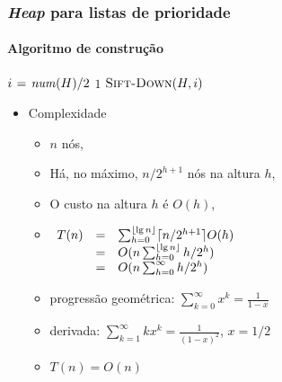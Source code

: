 \documentclass{beamer}
\begin{document}
\begin{frame}










\end{frame}

\begin{frame}
  \frametitle{\textit{Heap} para listas de prioridade}
  \framesubtitle{Algoritmo de construção}

\begin{codebox}
\li \For $i \gets \id{num}(H)/2$ \Downto $1$
\li   \Do 
        $\textnormal{\scshape Sift-Down}(H, i)$
      \End
\end{codebox}

\begin{itemize}
\item Complexidade
\begin{itemize}
\item $n$ nós,
\item Há, no máximo, $n/2^{h+1}$ nós na altura $h$,
\item O custo na altura $h$ é $O(h)$,
\item $\begin{array}[t]{rcl}
    T(n) & = & \sum_{h=0}^{\lfloor \lg n \rfloor} \lceil n / 2^{h+1} \rceil O(h) \\
    & = & O(n \sum_{h=0}^{\lfloor \lg n \rfloor} h/2^h) \\
    & = & O(n \sum_{h=0}^{\infty} h/2^h)
  \end{array}$
\item progressão geométrica: $\sum_{k=0}^{\infty} x^k = \frac{1}{1-x}$
\item derivada: $\sum_{k=1}^{\infty} k x^k = \frac{1}{(1-x)^2}$, $x = 1/2$
\item $T(n) = O(n)$
\end{itemize}
\end{itemize}
  
\end{frame}
\end{document}
